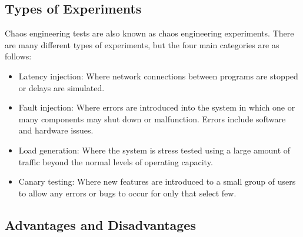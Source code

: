 \documentclass[conference]{IEEEtran}
\begin{document}
\subsection{Types of Experiments}

Chaos engineering tests are also known as chaos engineering experiments. There are many different types of experiments, but the four main categories are as follows:
\begin{itemize}
	\item Latency injection: Where network connections between programs are stopped or delays are simulated.
	\item Fault injection: Where errors are introduced into the system in which one or many components may shut down or malfunction. Errors include software and hardware issues.
	\item Load generation: Where the system is stress tested using a large amount of traffic beyond the normal levels of operating capacity.
	\item Canary testing: Where new features are introduced to a small group of users to allow any errors or bugs to occur for only that select few. \cite{b2}
\end{itemize}

\subsection{Advantages and Disadvantages}
\end{document}
